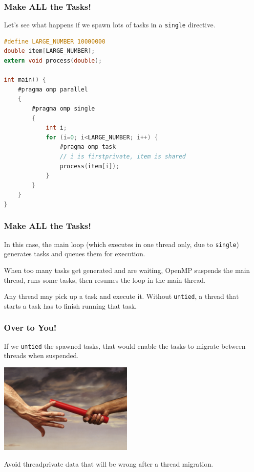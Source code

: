\begin{frame}[fragile]
\frametitle{Make ALL the Tasks!}

Let's see what happens
if we spawn lots of tasks in a {\tt single} directive.

  \begin{lstlisting}[language=C]
#define LARGE_NUMBER 10000000
double item[LARGE_NUMBER];
extern void process(double);

int main() {
    #pragma omp parallel
    {
        #pragma omp single
        {
            int i;
            for (i=0; i<LARGE_NUMBER; i++) {
                #pragma omp task
                // i is firstprivate, item is shared
                process(item[i]);
            }
        }
    }
}
  \end{lstlisting}

\end{frame}


\begin{frame}[fragile]
\frametitle{Make ALL the Tasks!}

In this case, the main loop (which executes in one thread only, due to {\tt single}) generates tasks and queues them for execution.

When too many tasks get generated and are waiting, OpenMP suspends the main thread, runs some tasks, then resumes the loop in the main thread.

Any thread may pick up a task and execute it. Without {\tt untied}, a thread that starts a task has to finish running that task.


\end{frame}

\begin{frame}
\frametitle{Over to You!}


If we {\tt untied} the spawned tasks, that would enable the tasks to
migrate between threads when suspended.


\begin{center}
	\includegraphics[width=0.5\textwidth]{images/baton.jpg}
\end{center}


Avoid threadprivate data that
will be wrong after a thread migration.

\end{frame}


